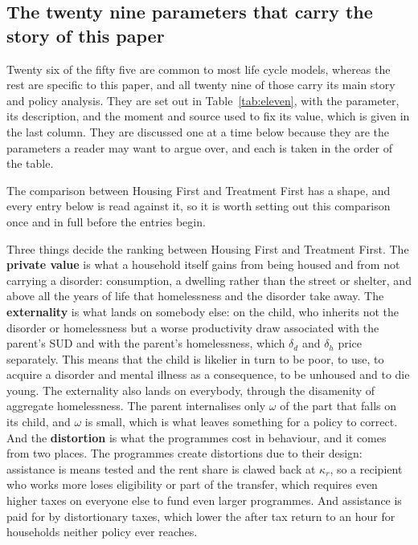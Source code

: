 \documentclass[10pt]{article}
\begin{document}
\subsection{The twenty nine parameters that carry the story of this paper}

Twenty six of the fifty five are common to most life cycle
models, whereas the rest are specific to this paper, and all twenty
nine of those carry its main story and policy analysis. They are set out in Table~\ref{tab:eleven},
with the parameter, its description,
and the moment and source used to fix its value, which is given in the last
column. They are discussed one at a time below because they are the parameters a
reader may want to argue over, and each is taken in the order of the table.

The comparison between Housing First and Treatment First has a shape,
and every entry below is read against it, so it is worth setting out this
comparison once and in full before the entries begin.

Three things decide the ranking between Housing First and Treatment
First. The \textbf{private value} is what a household
itself gains from being housed and from not carrying a disorder: consumption, a
dwelling rather than the street or shelter, and above all the years of life that
homelessness and the disorder take away. The \textbf{externality} is what
lands on somebody else: on the child, who inherits not the disorder
or homelessness but a
worse productivity draw associated with the parent's SUD
and with the parent's homelessness, which $\delta_d$ and $\delta_h$
price separately. This means that the child is
likelier in turn to be poor, to use, to acquire
a disorder and mental illness as a consequence, to be unhoused and to die young.
The externality also lands on everybody, through the disamenity of aggregate homelessness. The parent
internalises only $\omega$ of the part that falls on its child, and $\omega$ is
small, which is what leaves something for a policy to correct. And the
\textbf{distortion} is what the programmes cost in behaviour, and it comes from two
places. The programmes create distortions due to their design:
assistance is means tested and the rent share is clawed back at $\kappa_r$,
so a recipient who works more loses eligibility or part of the transfer, which requires
even higher taxes on everyone else to fund even larger programmes. And
assistance is paid for by
distortionary taxes, which lower the after tax return to an hour for households
neither policy ever reaches.
\end{document}
